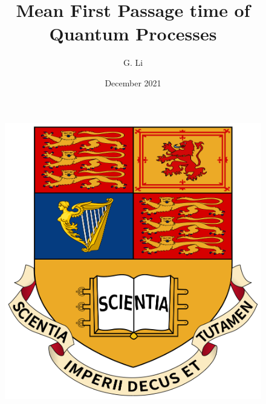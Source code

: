 \documentclass{article}
\title{Mean First Passage time of Quantum Processes}
\author{G. Li}
\date{December 2021}
\numberwithin{equation}{section}
\newcommand{\1}{\mathbb{1}}
\begin{document}
\begin{figure}
    \centering
    \includegraphics[scale=0.2]{Logo.png}
\end{figure}
\maketitle
\newpage
\tableofcontents
\newpage
\end{document}
